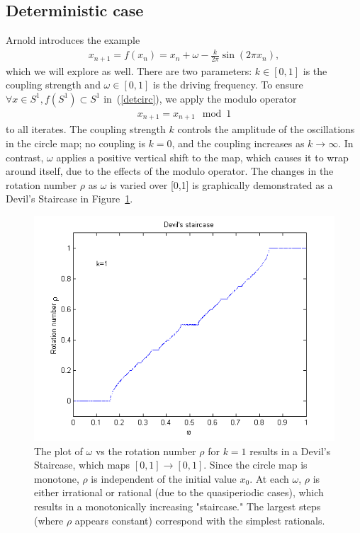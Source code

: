 \subsection{Deterministic case}
Arnold introduces the example
\begin{align}\label{detcirc}
x_{n+1}= f(x_n) =  x_n + \omega - \frac{k}{2\pi}\sin(2\pi x_n),
\end{align}
which we will explore as well. There are two parameters: $k \in [0,1]$
is the coupling strength and $\omega \in [0,1]$ is the driving
frequency. To ensure $\forall x \in S^1, f(S^1) \subset S^1$ in~(\ref{detcirc}), we apply the
modulo operator 
\begin{align*}
x_{n+1}=x_{n+1} \mod 1
\end{align*}
to all iterates. The coupling strength $k$
controls the amplitude of the oscillations in the circle map; no
coupling is $k=0$, and the coupling increases as $k \to \infty$. In contrast, $\omega$
applies a positive vertical shift to the map, which causes it to wrap around itself, due to the effects of the modulo operator. The changes in the rotation number $\rho$ as $\omega$ is
varied over [0,1] is graphically demonstrated as a Devil's Staircase
in Figure~\ref{fig:devil_det}. 
\begin{figure}[!h]
\caption[The Devil's Staircase for the deterministic circle map]{The
  plot of $\omega$ vs the rotation number $\rho$ for $k=1$ results in a Devil's
  Staircase, which maps $[0,1]\to [0,1]$. Since the circle map is monotone, $\rho$ is independent of
  the initial value $x_0$. At each $\omega$, $\rho$ is either
  irrational or rational (due to the quasiperiodic cases), which results in a monotonically increasing
  "staircase." The largest steps (where $\rho$ appears constant)
  correspond with the simplest rationals.}\label{fig:devil_det}
	\begin{center}
		\includegraphics[scale=0.7]{figs/devil_nonrandom_k1.png}
	\end{center}
\end{figure}
